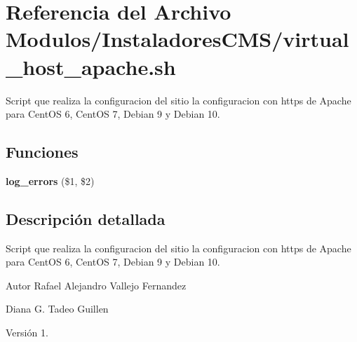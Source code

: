 \hypertarget{virtual__host__apache_8sh}{}\section{Referencia del Archivo Modulos/\+Instaladores\+C\+M\+S/virtual\+\_\+host\+\_\+apache.sh}
\label{virtual__host__apache_8sh}


Script que realiza la configuracion del sitio la configuracion con https de Apache para Cent\+OS 6, Cent\+OS 7, Debian 9 y Debian 10.  


\subsection*{Funciones}
\begin{DoxyCompactItemize}
\item 
\mbox{\label{virtual__host__apache_8sh_a92067b58a8478c9841b2cd9b75ea3565}} 
{\bfseries log\+\_\+errors} (\$1, \$2)
\end{DoxyCompactItemize}


\subsection{Descripción detallada}
Script que realiza la configuracion del sitio la configuracion con https de Apache para Cent\+OS 6, Cent\+OS 7, Debian 9 y Debian 10. 

\begin{DoxyAuthor}{Autor}
Rafael Alejandro Vallejo Fernandez 

Diana G. Tadeo Guillen 
\end{DoxyAuthor}
\begin{DoxyVersion}{Versión}
1. 
\end{DoxyVersion}

